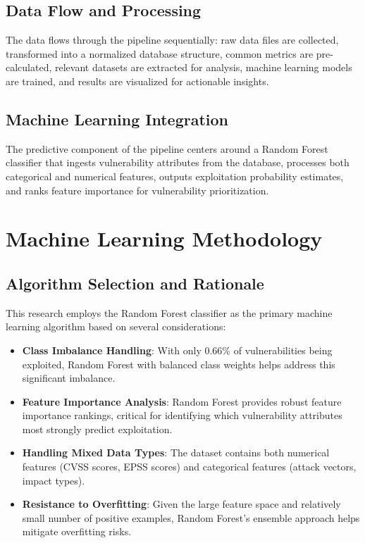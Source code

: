 \documentclass[runningheads]{llncs}
\begin{document}
\subsection{Data Flow and Processing}
The data flows through the pipeline sequentially: raw data files are collected, transformed into a normalized database structure, common metrics are pre-calculated, relevant datasets are extracted for analysis, machine learning models are trained, and results are visualized for actionable insights.

\subsection{Machine Learning Integration}
The predictive component of the pipeline centers around a Random Forest classifier \cite{breiman2001random} that ingests vulnerability attributes from the database, processes both categorical and numerical features, outputs exploitation probability estimates, and ranks feature importance for vulnerability prioritization.

\section{Machine Learning Methodology}
\label{sec:ml_methodology}

\subsection{Algorithm Selection and Rationale}
This research employs the Random Forest classifier as the primary machine learning algorithm based on several considerations:

\begin{itemize}
    \item \textbf{Class Imbalance Handling}: With only 0.66\% of vulnerabilities being exploited, Random Forest with balanced class weights helps address this significant imbalance.
    
    \item \textbf{Feature Importance Analysis}: Random Forest provides robust feature importance rankings, critical for identifying which vulnerability attributes most strongly predict exploitation.
    
    \item \textbf{Handling Mixed Data Types}: The dataset contains both numerical features (CVSS scores, EPSS scores) and categorical features (attack vectors, impact types).
    
    \item \textbf{Resistance to Overfitting}: Given the large feature space and relatively small number of positive examples, Random Forest's ensemble approach helps mitigate overfitting risks.
\end{itemize}
\end{document}
